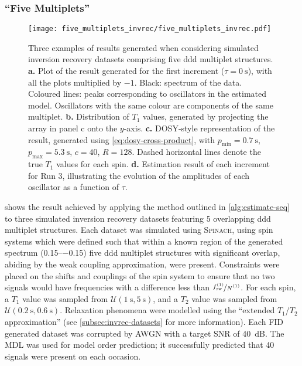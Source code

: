 \subsubsection{``Five Multiplets''}
\begin{figure}
    \texttt{[image: five\_multiplets\_invrec/five\_multiplets\_invrec.pdf]}
    \caption[
        Three examples of results generated wehn considering simulated
        inversion recovery datasets comprising five ddd multiplet structures.
    ]
    {
        Three examples of results generated when considering
        simulated inversion recovery datasets comprising five ddd multiplet
        structures.
        \textbf{a.} Plot of the result generated for the first increment ($\tau
        = \qty{0}{\second}$), with all the plots multiplied by $-1$. Black:
        spectrum of the data. Coloured lines: peaks corresponding to
        oscillators in the estimated model. Oscillators with the same colour
        are components of the same multiplet.
        \textbf{b.} Distribution of $T_1$ values, generated
        by projecting the array in panel c onto the $y$-axis.
        \textbf{c.} \ac{DOSY}-style representation of the result, generated using
        \cref{eq:dosy-cross-product},
        with
        $p_{\text{min}} = \qty{0.7}{\second}$,
        $p_{\text{max}} = \qty{5.3}{\second}$,
        $c = 40$,
        $R=128$.
        Dashed horizontal lines denote the true $T_1$ values for each spin.
        \textbf{d.} Estimation result of each increment for Run 3,
        illustrating the evolution of the amplitudes of each oscillator as a
        function of $\tau$.
    }
    \label{fig:five-multiplets-invrec}
\end{figure}
 shows the result achieved by applying the
method outlined in \cref{alg:estimate-seq}
to three simulated inversion recovery datasets featuring 5 overlapping ddd
multiplet structures.
Each dataset was simulated using \textsc{Spinach}, using spin systems which
were defined such that within a
known region of the generated spectrum
(\SIrange{0.15}{-0.15}{\partspermillion}) five ddd
multiplet structures with significant overlap, abiding by the weak coupling
approximation, were present.
Constraints were placed on the shifts and
couplings of the spin system to ensure that no two signals would have
frequencies with a difference less than $\nicefrac{\fswone}{\None}$.
For each spin, a $T_1$ value was sampled from $\mathcal{U}(\qty{1}{\second},
\qty{5}{\second})$, and a $T_2$ value was sampled from
$\mathcal{U}(\qty{0.2}{\second}, \qty{0.6}{\second})$.
Relaxation phenomena were modelled using the ``extended $T_1$/$T_2$
approximation''\cite{SpinachRelax} (see \cref{subsec:invrec-datasets} for more
information).
Each \ac{FID} generated dataset was corrupted by \ac{AWGN} with a target
\ac{SNR} of \qty{40}{\deci\bel}. The \ac{MDL} was used for model order
prediction; it successfully predicted that 40 signals were present on each
occasion.

